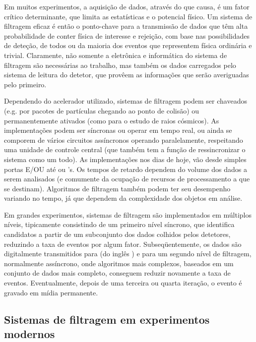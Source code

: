 Em muitos experimentos, a aquisição de dados, através do  que
causa, é um fator crítico determinante, que limita as estatísticas e o
potencial físico. Um sistema de filtragem eficaz é então o ponto-chave para a
transmissão de dados que têm alta probabilidade de conter física de interesse
e rejeição, com base nas possibilidades de deteção, de todos ou da maioria dos
eventos que representem física ordinária e trivial. Claramente, não somente a
eletrônica e informática do sistema de filtragem são necessárias ao trabalho,
mas também os dados carregados pelo sistema de leitura do detetor, que provêem
as informações que serão averiguadas pelo primeiro.

Dependendo do acelerador utilizado, sistemas de filtragem podem ser chaveados
(e.g. por pacotes de partículas chegando ao ponto de colisão) ou
permanentemente ativados (como para o estudo de raios cósmicos). As
implementações podem ser síncronas ou operar em tempo real, ou ainda
se comporem de vários circuitos assíncronos operando paralelamente,
respeitando uma unidade de controle central (que também tem a função de
ressincronizar o sistema como um todo). As implementações nos dias de hoje, vão
desde simples portas E/OU até  ou
's. Os tempos de retardo dependem do volume dos dados a serem
analisados (e comumente da ocupação de recursos de processamento a que se
destinam). Algoritmos de filtragem também podem ter seu desempenho variando no
tempo, já que dependem da complexidade dos objetos em análise.

Em grandes experimentos, sistemas de filtragem são implementados em múltiplos
níveis, tipicamente consistindo de um primeiro nível síncrono, que identifica
candidatos a partir de um subconjunto dos dados colhidos pelos detetores,
reduzindo a taxa de eventos por algum fator. Subseqüentemente, os dados são
digitalmente transmitidos para  (do inglês
) e para um segundo nível de filtragem, normalmente assíncrono,
onde algoritmos mais complexos, baseados em um conjunto de dados mais
completo, conseguem reduzir novamente a taxa de eventos. Eventualmente,
depois de uma terceira ou quarta iteração, o evento é gravado em mídia
permanente.

\subsection{Sistemas de filtragem em experimentos modernos}

